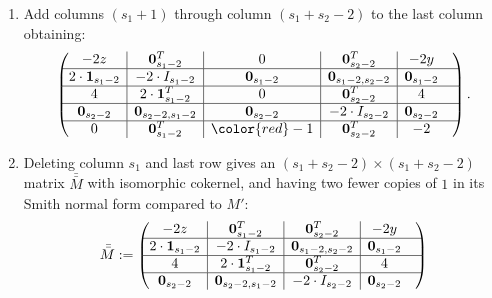 \documentclass[10pt,reqno]{amsart}
\newcommand{\rvline}{\hspace*{-\arraycolsep}\vline\hspace*{-\arraycolsep}}
\def\onesvector{\mathbf{1}}
\def\zerovector{\mathbf{0}}
\begin{document}
\begin{enumerate}
\item Add columns $(s_1+1)$ through column $(s_1+s_2-2)$ to the last column obtaining:
\begin{equation*} 
\begin{pmatrix}
-2z & \rvline & \zerovector^T_{s_1-2}  & \rvline &  0&\rvline &\zerovector^T_{s_2-2}  &\rvline&-2y\\
\hline
2\cdot\onesvector_{s_1-2} & \rvline & -2 \cdot I_{s_1-2} & \rvline & \zerovector_{s_1-2}&\rvline & \zerovector_{s_1-2,s_2-2}&\rvline &\zerovector_{s_1-2}\\
\hline
4  & \rvline & 2 \cdot \onesvector^T_{s_1-2} & \rvline & 0& \rvline & \zerovector^T_{s_2-2}   & \rvline &4\\
\hline
 \zerovector_{s_2-2} & \rvline & \zerovector_{s_2-2,s_1-2}& \rvline &\zerovector_{s_2-2} &\rvline & -2 \cdot I_{s_2-2}& \rvline &\zerovector_{s_2-2}\\
\hline
0 & \rvline & \zerovector^T_{s_1-2}  & \rvline &{\color{red}-1}&\rvline &  \zerovector^T_{s_2-2}&\rvline & -2 &\\
\end{pmatrix}.
\end{equation*}
\item Deleting column $s_1$ and last row
gives an $(s_1+s_2-2) \times (s_1+s_2-2) $ matrix $\bar{\bar{M}}$ with isomorphic cokernel, and having two fewer copies of $1$ in its Smith normal form compared to $M'$:
\begin{equation*}
\bar{\bar{M}}:=\begin{pmatrix}
-2z & \rvline & \zerovector^T_{s_1-2} & \rvline &  \zerovector^T_{s_2-2} &\rvline &-2y  &\\
\hline
2\cdot\onesvector_{s_1-2} & \rvline & -2 \cdot I_{s_1-2} & \rvline &\zerovector_{s_1-2,s_2-2} &\rvline & \zerovector_{s_1-2} &\\
\hline
4  & \rvline & 2 \cdot \onesvector^T_{s_1-2} & \rvline & \zerovector^T_{s_2-2}& \rvline & 4   &\\
\hline
 \zerovector_{s_2-2} & \rvline & \zerovector_{s_2-2,s_1-2}& \rvline &-2 \cdot I_{s_2-2}&\rvline & \zerovector_{s_2-2} &\\

\end{pmatrix}
\end{equation*}


\end{enumerate}
\end{document}
